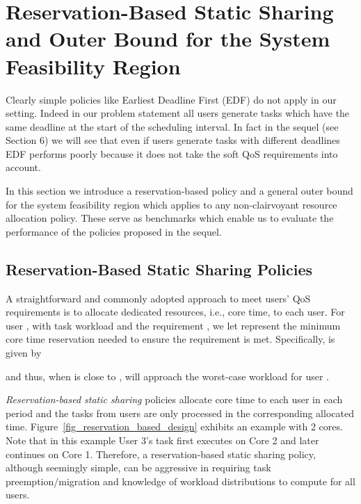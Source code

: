 \documentclass[prodmode,acmtompecs]{acmsmall}
\newcommand{\myComments}[1]{}
\newif\ifdissertation
\newcommand{\dissertationStart}{\ifdissertation  \myComments{Dissertation version: }}
\newcommand{\commentEnd}{\myComments{End}}
\newcommand{\add}[1]{#1}
\begin{document}
\section{Reservation-Based Static Sharing and Outer Bound for the System Feasibility Region}
\dissertationStart
In the next few sections we will analyze and compare several resource allocation policies for the SRT-MIC systems with the aim of motivating good policies for more complicated practical systems.
\commentEnd\fi 
\add{Clearly simple policies like Earliest Deadline First (EDF) do not apply in our setting. Indeed in our problem statement all users generate tasks
which have the same deadline at the start of the scheduling interval. In fact in the sequel (see Section 6) we will see that even if users generate tasks with
different deadlines EDF performs poorly because it does not take the soft QoS requirements  into account.}

In this section we introduce a reservation-based policy and a general outer bound for the system feasibility region  which applies to any non-clairvoyant resource allocation policy. These serve as benchmarks which enable us to evaluate the performance of the policies proposed in the sequel. 



\subsection{Reservation-Based Static Sharing Policies}
\label{subsection_reservation_based_design}
A straightforward and commonly adopted approach to meet users' QoS requirements  is to allocate dedicated resources, i.e., core time, to each user. For user , with task workload  and the requirement , we let  represent the minimum core time reservation needed to ensure the requirement is met. Specifically,  is given by

and thus, when  is close to ,  will approach the worst-case workload for user . 

{\em Reservation-based static sharing} policies allocate core time  to each user  in each period and the tasks from users are only processed in the corresponding allocated time. Figure~{\ref{fig_reservation_based_design}} exhibits an example with 2 cores. Note that in this example User 3's task first executes on Core 2 and later continues on Core 1. Therefore, a reservation-based static sharing policy, although seemingly simple, can be aggressive in requiring task preemption/migration and knowledge of workload distributions to compute  for all users. 
\end{document}
